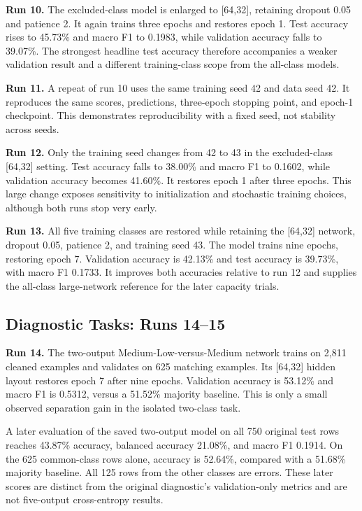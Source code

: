 \documentclass[11pt,letterpaper]{article}
\newcommand{\ML}{Medium-Low}
\newcommand{\run}[1]{\textbf{Run #1.}}
\begin{document}
\run{10} The excluded-class model is enlarged to [64,32], retaining dropout 0.05 and patience 2. It again trains three epochs and restores epoch 1. Test accuracy rises to 45.73\% and macro F1 to 0.1983, while validation accuracy falls to 39.07\%. The strongest headline test accuracy therefore accompanies a weaker validation result and a different training-class scope from the all-class models.

\run{11} A repeat of run 10 uses the same training seed 42 and data seed 42. It reproduces the same scores, predictions, three-epoch stopping point, and epoch-1 checkpoint. This demonstrates reproducibility with a fixed seed, not stability across seeds.

\run{12} Only the training seed changes from 42 to 43 in the excluded-class [64,32] setting. Test accuracy falls to 38.00\% and macro F1 to 0.1602, while validation accuracy becomes 41.60\%. It restores epoch 1 after three epochs. This large change exposes sensitivity to initialization and stochastic training choices, although both runs stop very early.

\run{13} All five training classes are restored while retaining the [64,32] network, dropout 0.05, patience 2, and training seed 43. The model trains nine epochs, restoring epoch 7. Validation accuracy is 42.13\% and test accuracy is 39.73\%, with macro F1 0.1733. It improves both accuracies relative to run 12 and supplies the all-class large-network reference for the later capacity trials.

\subsection{Diagnostic Tasks: Runs 14--15}
\run{14} The two-output \ML-versus-Medium network trains on 2,811 cleaned examples and validates on 625 matching examples. Its [64,32] hidden layout restores epoch 7 after nine epochs. Validation accuracy is 53.12\% and macro F1 is 0.5312, versus a 51.52\% majority baseline. This is only a small observed separation gain in the isolated two-class task.

A later evaluation of the saved two-output model on all 750 original test rows reaches 43.87\% accuracy, balanced accuracy 21.08\%, and macro F1 0.1914. On the 625 common-class rows alone, accuracy is 52.64\%, compared with a 51.68\% majority baseline. All 125 rows from the other classes are errors. These later scores are distinct from the original diagnostic's validation-only metrics and are not five-output cross-entropy results.
\end{document}

